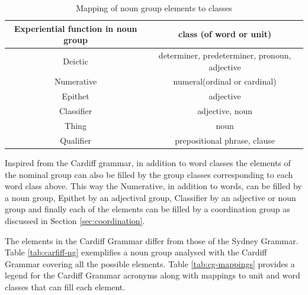 \begin{table}[!ht]
        \centering
	\begin{tabulary}{0.9\linewidth}{|C|C|}
		\hline
		\textbf{Experiential function in noun group} & \textbf{class (of word or unit)} \\ \hline
		Deictic                             & determiner, predeterminer, pronoun, adjective \\ \hline
		Numerative                          & numeral(ordinal or cardinal) \\ \hline
		Epithet                             & adjective \\ \hline
		Classifier                          & adjective, noun \\ \hline
		Thing                               & noun                         \\ \hline
		Qualifier                           & prepositional phrase, clause \\ \hline
	\end{tabulary}
	\caption{Mapping of noun group elements to classes \citep[379]{Halliday2013}}
	\label{tab:function-pos-mapping}
\end{table}

Inspired from the Cardiff grammar, in addition to word classes the elements of the nominal group can also be filled by the group classes corresponding to each word class above. This way the Numerative, in addition to words, can be filled by a noun group, Epithet by an adjectival group, Classifier by an adjective or noun group and finally each of the elements can be filled by a coordination group as discussed in Section \ref{sec:coordination}.


The elements in the Cardiff Grammar differ from those of the Sydney Grammar. Table \ref{tab:carfiff-ng} exemplifies a noun group analysed with the Cardiff Grammar covering all the possible elements. Table \ref{tab:cg-mappings} provides a legend for the Cardiff Grammar acronyms along with mappings to unit and word classes that can fill each element.

